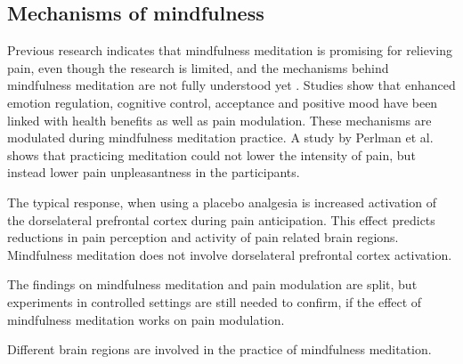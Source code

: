 

\subsection{Mechanisms of mindfulness}

Previous research indicates that mindfulness meditation is promising for relieving pain, even though the research is limited, and the mechanisms behind mindfulness meditation are not fully understood yet \cite{Perlman2010}. 
Studies show that enhanced emotion regulation, cognitive control, acceptance and positive mood have been linked with health benefits as well as pain modulation. These mechanisms are modulated during mindfulness meditation practice. A study by Perlman et al. \cite{Perlman2010} shows that practicing meditation could not lower the intensity of pain, but instead lower pain unpleasantness in the participants. \cite{Zeidan2012, Perlman2010}

The typical response, when using a placebo analgesia is increased activation of the dorselateral prefrontal cortex during pain anticipation. This effect predicts reductions in pain perception and activity of pain related brain regions. Mindfulness meditation does not involve dorselateral prefrontal cortex activation. \cite{Zeidan2012}

The findings on mindfulness meditation and pain modulation are split, but experiments in controlled settings are still needed to confirm, if the effect of mindfulness meditation works on pain modulation. \cite{Zeidan2012, Perlman2010}



Different brain regions are involved in the practice of mindfulness meditation. 

